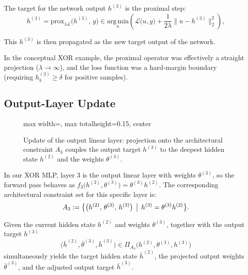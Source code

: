 The target for the network output $h^{(3)}$ is the proximal step:
\begin{equation}
\label{eq:proximal-step}
h^{(3)} = \mathrm{prox}_{\lambda \mathcal{L}}\bigl(h^{(3)},\, y\bigr) \in \underset{u}{\mathrm{arg\,min}} \left( \mathcal{L}\bigl(u, y\bigr) + \frac{1}{2\lambda} \bigl\|u - h^{(3)}\bigr\|_2^2 \right),
\end{equation}

This $h^{(3)}$ is then propagated as the new target output of the network.
\begin{tcolorbox}
 In the conceptual XOR example, the proximal operator was effectively a straight projection ($\lambda\rightarrow\infty$), and the loss function was a hard-margin boundary (requiring $h_b^{(3)} \ge \delta$ for positive samples). 
\end{tcolorbox}
 \subsection{Output-Layer Update}
\begin{figure}[htbp]
\centering
\begin{adjustbox}{max width=\textwidth, max totalheight=0.15\textheight, center}

\end{adjustbox}
\caption{Update of the output linear layer: projection onto the architectural constraint
$A_{3}$ couples the output target ${h}^{(3)}$ to the deepest hidden state
$h^{(2)}$ and the weights $\theta^{(3)}$.}
\label{fig:next_back_prop}
\end{figure}

In our XOR MLP, layer 3 is the output linear layer with weights $\theta^{(3)}$, so the forward pass behaves as $f_3\bigl(h^{(2)},\theta^{(3)}\bigr) = \theta^{(3)} h^{(2)}$. The corresponding architectural constraint set for this specific layer is:
\begin{equation}
A_{3} := \bigl\{\bigl(h^{(2)},\, \theta^{(3)},\, h^{(3)}\bigr) \,\bigm|\, h^{(3)} = \theta^{(3)} h^{(2)} \bigr\}.
\end{equation}

Given the current hidden state $h^{(2)}$ and weights $\theta^{(3)}$, together with the output target $h^{(3)}$ 
\begin{equation}
\bigl(\bar{h}^{(2)}, \bar{\theta}^{(3)}, \bar{h}^{(3)}\bigr) \in \Pi_{A_{3}}\!\bigl(h^{(2)}, \theta^{(3)}, h^{(3)}\bigr)
\end{equation}
simultaneously yields the target hidden state $\bar{h}^{(2)}$, the projected output weights $\bar{\theta}^{(3)}$, and the adjusted output target $\bar{h}^{(3)}$. 


